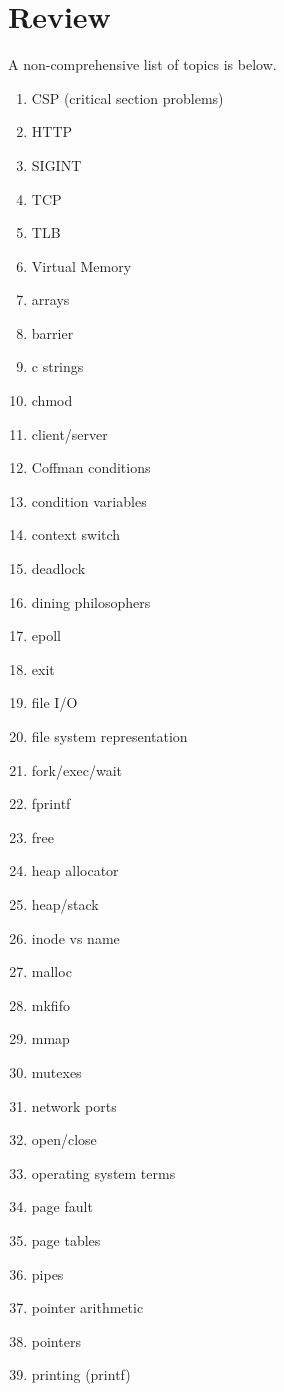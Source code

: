 \chapter{Review}

A non-comprehensive list of topics is below.

\begin{enumerate}
\item CSP (critical section problems)
\item HTTP
\item SIGINT
\item TCP
\item TLB
\item Virtual Memory
\item arrays
\item barrier
\item c strings
\item chmod
\item client/server
\item Coffman conditions
\item condition variables
\item context switch
\item deadlock
\item dining philosophers
\item epoll
\item exit
\item file I/O
\item file system representation
\item fork/exec/wait
\item fprintf
\item free
\item heap allocator
\item heap/stack
\item inode vs name
\item malloc
\item mkfifo
\item mmap
\item mutexes
\item network ports
\item open/close
\item operating system terms
\item page fault
\item page tables
\item pipes
\item pointer arithmetic
\item pointers
\item printing (printf)

\end{enumerate}
